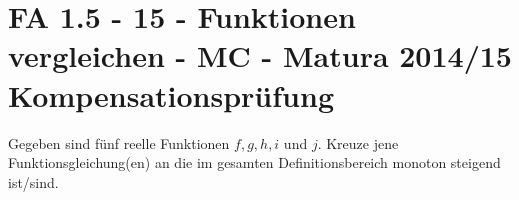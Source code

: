 \section{FA 1.5 - 15 - Funktionen vergleichen - MC - Matura 2014/15 Kompensationsprüfung}

\begin{beispiel}[FA 1.5]{1} %
				Gegeben sind fünf reelle Funktionen $f,g,h,i$ und $j$. Kreuze jene Funktionsgleichung(en) an die im gesamten Definitionsbereich monoton steigend ist/sind.
				
\end{beispiel}